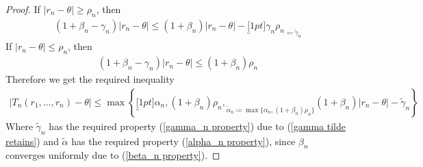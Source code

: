 \begin{proof}
    \noindent If \(|r_n-\theta|\ge\rho_n\), then
    \begin{align}
        (1+\beta_n -\gamma_n)|r_n-\theta| \le  (1+\beta_n)|r_n-\theta| - 
        \underbracket[1pt]{\gamma_n \rho_n}_{\eqqcolon \tilde{\gamma}_n}
    \end{align}
    If \(|r_n-\theta|\le\rho_n\), then
    \begin{align}
        (1+\beta_n -\gamma_n)|r_n-\theta|\le (1+\beta_n)\rho_n        
    \end{align}
    Therefore we get the required inequality
    \begin{align*}
        |T_n(r_1,\dots,r_n)-\theta|\le 
        \max\left\{ \underbracket[1pt]{\alpha_n, (1+\beta_n)\rho_n,}_{
            \tilde{\alpha}_n \coloneqq \max\{\alpha_n, (1+\beta_n)\rho_n\}
        } 
        (1+\beta_n)|r_n-\theta| - \tilde{\gamma}_n\right\}
    \end{align*}
    Where \(\tilde{\gamma}_n\) has the required property (\ref{gamma_n property}) due to (\ref{gamma tilde retains}) and \(\tilde{\alpha}\) has the required property (\ref{alpha_n property}), since \(\beta_n\) converges uniformly due to (\ref{beta_n property}).
\end{proof}

